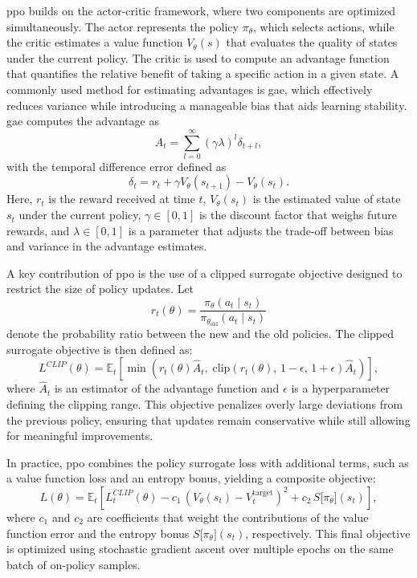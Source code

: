 \gls{ppo} builds on the actor-critic framework, where two components are optimized simultaneously. The actor represents the policy \(\pi_\theta\), which selects actions, while the critic estimates a value function \(V_\theta(s)\) that evaluates the quality of states under the current policy. The critic is used to compute an advantage function that quantifies the relative benefit of taking a specific action in a given state. A commonly used method for estimating advantages is \gls{gae}, which effectively reduces variance while introducing a manageable bias that aids learning stability. \gls{gae} computes the advantage as
\[
\hat{A}_t = \sum_{l=0}^{\infty} (\gamma \lambda)^l \delta_{t+l},
\]
with the temporal difference error defined as
\[
\delta_t = r_t + \gamma V_\theta(s_{t+1}) - V_\theta(s_t).
\]
Here, \(r_t\) is the reward received at time \(t\), \(V_\theta(s_t)\) is the estimated value of state \(s_t\) under the current policy, \(\gamma \in [0,1]\) is the discount factor that weighs future rewards, and \(\lambda \in [0,1]\) is a parameter that adjusts the trade-off between bias and variance in the advantage estimates.

A key contribution of \gls{ppo} is the use of a clipped surrogate objective designed to restrict the size of policy updates. Let
\[
r_t(\theta) = \frac{\pi_\theta(a_t \mid s_t)}{\pi_{\theta_{\text{old}}}(a_t \mid s_t)}
\]
denote the probability ratio between the new and the old policies. The clipped surrogate objective is then defined as:
\[
L^{CLIP}(\theta) = \mathbb{E}_t\!\left[\min\!\left(r_t(\theta)\hat{A}_t,\;\text{clip}\left(r_t(\theta),\,1-\epsilon,\,1+\epsilon\right)\hat{A}_t\right)\right],
\]
where \(\hat{A}_t\) is an estimator of the advantage function and \(\epsilon\) is a hyperparameter defining the clipping range. This objective penalizes overly large deviations from the previous policy, ensuring that updates remain conservative while still allowing for meaningful improvements.

In practice, \gls{ppo} combines the policy surrogate loss with additional terms, such as a value function loss and an entropy bonus, yielding a composite objective:
\[
L(\theta) = \mathbb{E}_t \left[ L^{CLIP}_t(\theta) - c_1\, \left(V_\theta(s_t) - V_t^{\text{target}}\right)^2 + c_2\, S\big[\pi_\theta\big](s_t) \right],
\]
where \(c_1\) and \(c_2\) are coefficients that weight the contributions of the value function error and the entropy bonus \(S\big[\pi_\theta\big](s_t)\), respectively. This final objective is optimized using stochastic gradient ascent over multiple epochs on the same batch of on-policy samples.

